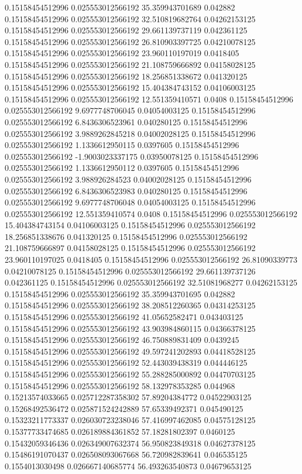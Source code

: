 0.15158454512996 0.025553012566192 35.359943701689 0.042882
0.15158454512996 0.025553012566192 32.510819682764 0.04262153125
0.15158454512996 0.025553012566192 29.661139737119 0.042361125
0.15158454512996 0.025553012566192 26.810903397725 0.04210078125
0.15158454512996 0.025553012566192 23.960110197019 0.0418405
0.15158454512996 0.025553012566192 21.108759666892 0.04158028125
0.15158454512996 0.025553012566192 18.256851338672 0.041320125
0.15158454512996 0.025553012566192 15.404384743152 0.04106003125
0.15158454512996 0.025553012566192 12.551359410571 0.0408
0.15158454512996 0.025553012566192 9.6977748706045 0.04054003125
0.15158454512996 0.025553012566192 6.8436306523961 0.040280125
0.15158454512996 0.025553012566192 3.9889262845218 0.04002028125
0.15158454512996 0.025553012566192 1.1336612950115 0.0397605
0.15158454512996 0.025553012566192 -1.9003023337175 0.03950078125
0.15158454512996 0.025553012566192 1.1336612950112 0.0397605
0.15158454512996 0.025553012566192 3.988926284523 0.04002028125
0.15158454512996 0.025553012566192 6.8436306523983 0.040280125
0.15158454512996 0.025553012566192 9.6977748706048 0.04054003125
0.15158454512996 0.025553012566192 12.551359410574 0.0408
0.15158454512996 0.025553012566192 15.404384743154 0.04106003125
0.15158454512996 0.025553012566192 18.256851338676 0.041320125
0.15158454512996 0.025553012566192 21.108759666897 0.04158028125
0.15158454512996 0.025553012566192 23.960110197025 0.0418405
0.15158454512996 0.025553012566192 26.81090339773 0.04210078125
0.15158454512996 0.025553012566192 29.661139737126 0.042361125
0.15158454512996 0.025553012566192 32.51081968277 0.04262153125
0.15158454512996 0.025553012566192 35.359943701695 0.042882
0.15158454512996 0.025553012566192 38.208512260365 0.04314253125
0.15158454512996 0.025553012566192 41.05652582471 0.043403125
0.15158454512996 0.025553012566192 43.903984860115 0.04366378125
0.15158454512996 0.025553012566192 46.750889831409 0.0439245
0.15158454512996 0.025553012566192 49.597241202893 0.04418528125
0.15158454512996 0.025553012566192 52.443039438319 0.044446125
0.15158454512996 0.025553012566192 55.288285000892 0.04470703125
0.15158454512996 0.025553012566192 58.132978353285 0.044968
0.15213574033665 0.025712287358302 57.89204384772 0.04522903125
0.15268492536472 0.025871524242889 57.65339492371 0.045490125
0.15323211773337 0.026030723238046 57.416997462085 0.04575128125
0.15377733474685 0.026189884361852 57.18281802397 0.0460125
0.15432059346436 0.026349007632374 56.950823849318 0.04627378125
0.15486191070437 0.026508093067668 56.720982839641 0.046535125
0.1554013030498 0.026667140685774 56.493263540873 0.04679653125
